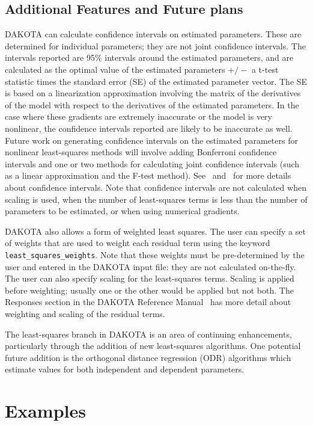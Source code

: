 \subsection{Additional Features and Future plans}\label{nls:solution:future}

DAKOTA can calculate confidence intervals on estimated parameters.
These are determined for individual parameters; they are not joint
confidence intervals.  The intervals reported are 95\% intervals
around the estimated parameters, and are calculated as the optimal
value of the estimated parameters $+/-$ a t-test statistic times the
standard error (SE) of the estimated parameter vector.  The SE is
based on a linearization approximation involving the matrix of the
derivatives of the model with respect to the derivatives of the
estimated parameters.  In the case where these gradients are extremely
inaccurate or the model is very nonlinear, the confidence intervals
reported are likely to be inaccurate as well.  Future work on
generating confidence intervals on the estimated parameters for
nonlinear least-squares methods will involve adding Bonferroni
confidence intervals and one or two methods for calculating joint
confidence intervals (such as a linear approximation and the F-test
method). See~\cite{Seb03} and~\cite{Vug07} for more details about
confidence intervals. Note that confidence intervals are not
calculated when scaling is used, when the number of least-squares
terms is less than the number of parameters to be estimated, or when
using numerical gradients.

DAKOTA also allows a form of weighted least squares.  The user can
specify a set of weights that are used to weight each residual term
using the keyword \texttt{least\_squares\_weights}.  Note that these
weights must be pre-determined by the user and entered in the DAKOTA
input file: they are not calculated on-the-fly.  The user can also
specify scaling for the least-squares terms.  Scaling is applied
before weighting; usually one or the other would be applied but not
both.  The Responses section in the DAKOTA Reference
Manual~\cite{RefMan} has more detail about weighting and scaling of
the residual terms.

The least-squares branch in DAKOTA is an area of continuing
enhancements, particularly through the addition of new least-squares
algorithms. One potential future addition is the orthogonal distance
regression (ODR) algorithms which estimate values for both independent
and dependent parameters.

\section{Examples}\label{nls:examples}

